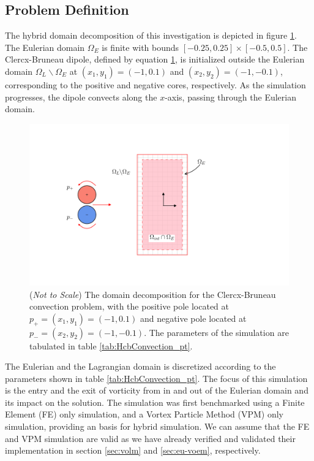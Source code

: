 \subsection{Problem Definition}

The hybrid domain decomposition of this investigation is depicted in figure \ref{fig:hcbconv_dd}. The Eulerian domain $\Omega_E$ is finite with bounds $[-0.25,0.25]\times[-0.5,0.5]$. The Clercx-Bruneau dipole, defined by equation \ref{fig:hcbconv_dd}, is initialized outside the Eulerian domain $\Omega_L\backslash\Omega_E$ at $(x_1,y_1) = (-1,0.1)$ and $(x_2,y_2)=(-1,-0.1)$, corresponding to the positive and negative cores, respectively. As the simulation progresses, the dipole convects along the $x$-axis, passing through the Eulerian domain.

	\begin{figure}[!h]
	\showthe\columnwidth
	\centering
	\includegraphics[trim=0cm 2.5cm 0cm 2.5cm, clip, width=\linewidth]{./figures/hybrid/cbConv/hcbconv_dd.pdf}
	\caption{(\textit{Not to Scale}) The domain decomposition for the Clercx-Bruneau convection problem, with the positive pole located at $p_{+}=(x_1,y_1) = (-1,0.1)$ and negative pole located at $p_{-}=(x_2,y_2)=(-1,-0.1)$. The parameters of the simulation are tabulated in table \ref{tab:HcbConvection_pt}.}
	\label{fig:hcbconv_dd}
	\end{figure}
	
The Eulerian and the Lagrangian domain is discretized according to the parameters shown in table \ref{tab:HcbConvection_pt}. The focus of this simulation is the entry and the exit of vorticity from in and out of the Eulerian domain and its impact on the solution. The simulation was first benchmarked using a Finite Element (FE) only simulation, and a Vortex Particle Method (VPM) only simulation, providing an basis for hybrid simulation. We can assume that the FE and VPM simulation are valid as we have already verified and validated their implementation in section \ref{sec:volm} and \ref{sec:eu-voem}, respectively.

